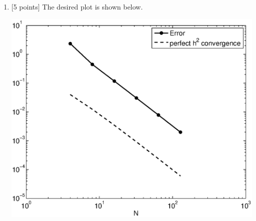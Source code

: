 \begin{solution}
\begin{enumerate}
\item {[5 points]} The desired plot is shown below.

\begin{center}
\includegraphics[scale=0.5]{error_b}
\end{center}


\end{enumerate}
\end{solution}
